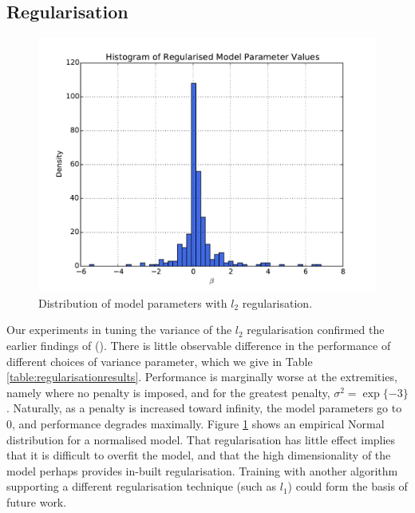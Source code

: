 \subsection{Regularisation}

\begin{figure}[h]
\center
\includegraphics[width=5.5in]{Figures/histogram.pdf}
\caption{Distribution of model parameters with $l_2$ regularisation.}
\label{fig:histogram}
\end{figure}

Our experiments in tuning the variance of the $l_2$ regularisation confirmed the earlier findings of (\cite{Peng04accurateinformation}). There is little observable difference in the performance of different choices of variance parameter, which we give in Table \ref{table:regularisationresults}. Performance is marginally worse at the extremities, namely where no penalty is imposed, and for the greatest penalty, $\sigma^2 = \exp\{-3\}$. Naturally, as a penalty is increased toward infinity, the model parameters go to 0, and performance degrades maximally. Figure \ref{fig:histogram} shows an empirical Normal distribution for a normalised model. That regularisation has little effect implies that it is difficult to overfit the model, and that the high dimensionality of the model perhaps provides in-built regularisation. Training with another algorithm supporting a different regularisation technique (such as $l_1$) could form the basis of future work.


